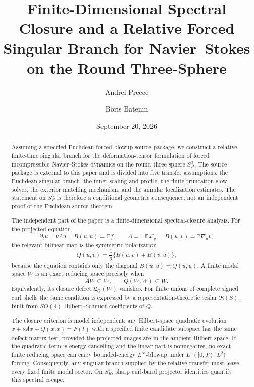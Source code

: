 \documentclass[aps,prd,reprint,superscriptaddress,nofootinbib,floatfix]{revtex4-2}
\theoremstyle{definition}
\theoremstyle{remark}
\newcommand{\PP}{\mathbb{P}}
\begin{document}
\title{Finite-Dimensional Spectral Closure and a Relative Forced Singular Branch for Navier--Stokes on the Round Three-Sphere}

\author{Andrei Preece}
\author{Boris Batenin}

\date{September 20, 2026}

\begin{abstract}

	Assuming a specified Euclidean forced-blowup source package, we construct a
	relative finite-time singular branch for the deformation-tensor formulation of
	forced incompressible Navier--Stokes dynamics on the round three-sphere
	\(S^3_R\).  The source package is external to this paper and is divided into
	five transfer assumptions: the Euclidean singular branch, the inner scaling
	and profile, the finite-truncation slow solver, the exterior matching
	mechanism, and the annular localization estimates.  The statement on
	\(S^3_R\) is therefore a conditional geometric consequence, not an independent
	proof of the Euclidean source theorem.

	The independent part of the paper is a finite-dimensional spectral-closure
	analysis.  For the projected equation
	\[
		\partial_tu+\nu Au+B(u,u)=\PP f,\qquad
		A=-\PP\mathcal L_g,\quad B(u,v)=\PP\nabla_u v,
	\]
	the relevant bilinear map is the symmetric polarization
	\[
		Q(u,v)=\frac12\{B(u,v)+B(v,u)\},
	\]
	because the equation contains only the diagonal \(B(u,u)=Q(u,u)\).  A finite
	modal space \(W\) is an exact reducing space precisely when
	\[
		AW\subset W,\qquad Q(W,W)\subset W .
	\]
	Equivalently, its closure defect \(\mathfrak L_Q(W)\) vanishes.  For finite
	unions of complete signed curl shells the same condition is expressed by a
	representation-theoretic scalar \(\mathfrak R(S)\), built from \(SO(4)\)
	Hilbert--Schmidt coefficients of \(Q\).

	The closure criterion is model independent: any Hilbert-space quadratic
	evolution \(\dot x+\nu Ax+Q(x,x)=F(t)\) with a specified finite candidate
	subspace has the same defect-matrix test, provided the projected images are in
	the ambient Hilbert space.  If the quadratic term is energy cancelling and the
	linear part is nonnegative, no exact finite reducing space can carry
	bounded-energy \(L^\infty\)-blowup under \(L^1([0,T);L^2)\) forcing.
	Consequently, any singular branch supplied by the relative transfer must leave
	every fixed finite modal sector.  On \(S^3_R\), sharp curl-band projector
	identities quantify this spectral escape.

\end{abstract}
\end{document}
